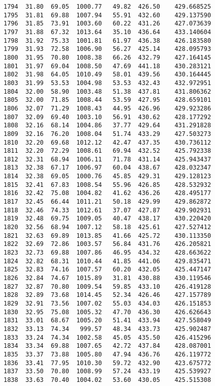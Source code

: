 \documentclass[11pt]{article}
\begin{document}
\begin{tcolorbox}[breakable, size=fbox, boxrule=.5pt, pad at break*=1mm, opacityfill=0]
\begin{Verbatim}[commandchars=\\\{\}]
1794  31.80  69.05  1000.77   49.82  426.50    429.668525
1795  31.81  69.88  1007.94   55.91  432.60    429.137590
1796  31.85  73.91  1003.60   60.22  431.26    427.073639
1797  31.88  67.32  1013.64   35.10  436.64    433.140604
1798  31.92  75.33  1001.81   61.97  436.38    426.183580
1799  31.93  72.58  1006.90   56.27  425.14    428.095793
1800  31.95  70.80  1008.38   66.26  432.79    427.164145
1801  31.97  69.04  1008.50   47.69  441.18    430.283121
1802  31.98  64.05  1010.49   58.01  439.56    430.164445
1803  31.99  53.53  1004.98   53.53  432.43    432.972951
1804  32.00  58.90  1003.48   51.38  437.81    431.806362
1805  32.00  71.85  1008.44   53.59  427.95    428.659101
1806  32.07  71.29  1008.43   44.95  426.96    429.923286
1807  32.09  69.40  1003.10   56.91  430.62    428.177292
1808  32.16  68.14  1004.86   37.77  429.64    431.291828
1809  32.16  76.20  1008.04   51.74  433.29    427.503273
1810  32.20  69.68  1012.12   42.47  437.35    430.736112
1811  32.20  72.29  1008.61   69.94  432.52    425.792338
1812  32.31  68.94  1006.11   71.78  431.14    425.943437
1813  32.38  67.17  1006.97   60.04  438.67    428.032347
1814  32.38  69.05  1000.76   45.85  429.31    429.128123
1815  32.41  67.83  1008.54   55.96  426.85    428.532932
1816  32.42  75.08  1004.82   41.62  436.26    428.495177
1817  32.45  66.44  1011.21   50.18  429.99    429.862872
1818  32.46  74.33  1012.61   37.07  427.87    429.902931
1819  32.48  69.75  1009.05   40.47  438.17    430.220420
1820  32.56  68.94  1007.12   58.18  425.61    427.527412
1821  32.63  69.89  1013.85   41.66  425.72    430.113350
1822  32.69  72.86  1003.57   56.84  431.76    426.205821
1823  32.73  69.88  1007.86   46.95  434.32    428.663622
1824  32.82  68.31  1010.44   41.85  441.06    429.835471
1825  32.83  74.16  1007.57   60.20  432.05    425.447147
1826  32.84  74.67  1015.89   31.81  430.88    430.119546
1827  32.87  70.80  1009.54   59.85  433.10    426.419128
1828  32.89  73.68  1014.45   52.34  426.46    427.157789
1829  32.91  73.56  1007.02   55.03  434.03    426.151853
1830  32.95  75.08  1005.32   47.70  436.30    426.626643
1831  33.01  68.67  1005.20   51.41  433.94    427.558049
1832  33.13  74.34   999.57   48.34  433.73    425.902487
1833  33.24  74.34  1002.58   45.05  435.50    426.415296
1834  33.34  69.88  1007.65   42.72  437.84    428.087001
1835  33.37  73.88  1005.80   47.94  436.76    426.119772
1836  33.41  77.95  1010.30   59.72  432.90    423.675772
1837  33.50  70.80  1008.99   57.24  433.19    425.539927
1838  33.63  70.40  1004.02   53.60  430.05    425.515308

\end{Verbatim}
\end{tcolorbox}
\end{document}
